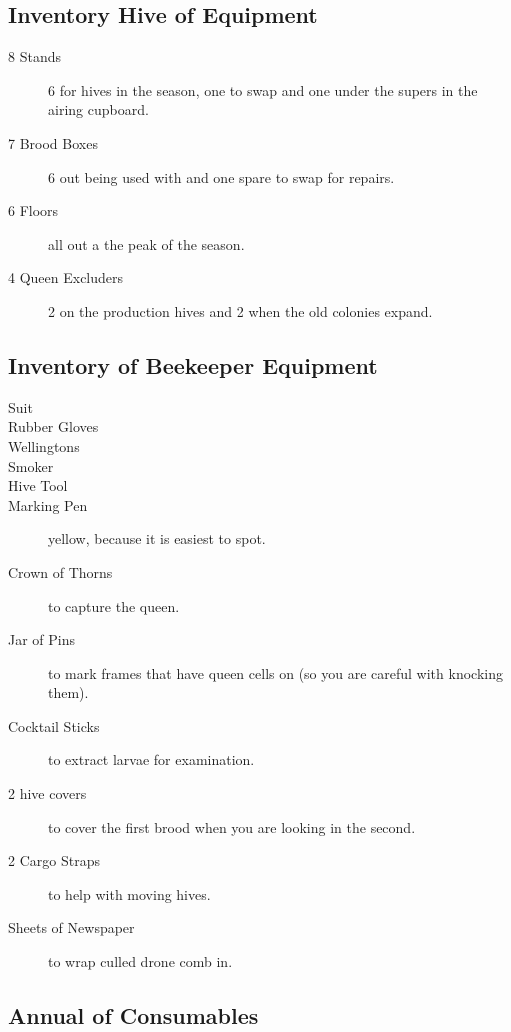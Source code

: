 \documentclass{./BeekeepingBook}
\begin{document}
\subsection{Inventory Hive of Equipment}

\begin{description}
  \item[8 Stands] 6 for hives in the season, one to swap and one under the supers in the airing cupboard.
  \item[7 Brood Boxes] 6 out being used with and one spare to swap for repairs.
  \item[6 Floors] all out a the peak of the season.
  \item[4 Queen Excluders] 2 on the production hives and 2 when the old colonies expand.
\end{description}

\subsection{Inventory of Beekeeper Equipment}

\begin{description}
  \item[Suit]  
  \item[Rubber Gloves] 
  \item[Wellingtons] 
  \item[Smoker] 
  \item[Hive Tool] 
  \item[Marking Pen] yellow, because it is easiest to spot.
  \item[Crown of Thorns]  to capture the queen.
  \item[Jar of Pins] to mark frames that have queen cells on (so you are careful with knocking them).
  \item[Cocktail Sticks]  to extract larvae for examination.
  \item[2 hive covers] to cover the first brood when you are looking in the second.
  \item[2 Cargo Straps] to help with moving hives. 
  \item[Sheets of Newspaper] to wrap culled drone comb in.
\end{description}

\subsection{Annual of Consumables}
\end{document}
